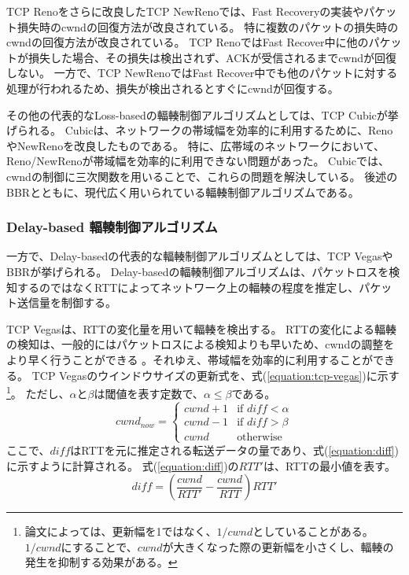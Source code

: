 \documentclass[a4paper,11pt]{jreport}
\newcommand{\equationref}[1]{式(\ref{#1})}
\begin{document}
TCP Renoをさらに改良したTCP NewReno\cite{floyd2004newreno,henderson2012newreno}では、Fast Recoveryの実装やパケット損失時のcwndの回復方法が改良されている。
特に複数のパケットの損失時のcwndの回復方法が改良されている。
TCP RenoではFast Recover中に他のパケットが損失した場合、その損失は検出されず、ACKが受信されるまでcwndが回復しない。
一方で、TCP NewRenoではFast Recover中でも他のパケットに対する処理が行われるため、損失が検出されるとすぐにcwndが回復する。

その他の代表的なLoss-basedの輻輳制御アルゴリズムとしては、TCP Cubic\cite{cubic}が挙げられる。
Cubicは、ネットワークの帯域幅を効率的に利用するために、RenoやNewRenoを改良したものである。
特に、広帯域のネットワークにおいて、Reno/NewRenoが帯域幅を効率的に利用できない問題があった。
Cubicでは、cwndの制御に三次関数を用いることで、これらの問題を解決している。
後述のBBR\cite{bbr}とともに、現代広く用いられている輻輳制御アルゴリズムである。

\subsubsection*{Delay-based 輻輳制御アルゴリズム}

一方で、Delay-basedの代表的な輻輳制御アルゴリズムとしては、TCP Vegas\cite{tcp-vegas}やBBR\cite{bbr}が挙げられる。
Delay-basedの輻輳制御アルゴリズムは、パケットロスを検知するのではなくRTTによってネットワーク上の輻輳の程度を推定し、パケット送信量を制御する。

TCP Vegasは、RTTの変化量を用いて輻輳を検出する。
RTTの変化による輻輳の検知は、一般的にはパケットロスによる検知よりも早いため、cwndの調整をより早く行うことができる
。それゆえ、帯域幅を効率的に利用することができる。
TCP Vegasのウインドウサイズの更新式を、\equationref{equation:tcp-vegas}に示す
\footnote{論文によっては、更新幅を1ではなく、$1/cwnd$としていることがある。
$1/cwnd$にすることで、$cwnd$が大きくなった際の更新幅を小さくし、輻輳の発生を抑制する効果がある。}。
ただし、$\alpha$と$\beta$は閾値を表す定数で、$\alpha \leq \beta$である。
\begin{equation}
  \label{equation:tcp-vegas}
  cwnd_{now} =
  \begin{cases}
    cwnd + 1 & \text{if } diff < \alpha \\
    cwnd - 1 & \text{if } diff > \beta \\
    cwnd & \text{otherwise}
  \end{cases}
\end{equation}
ここで、$diff$はRTTを元に推定される転送データの量であり、\equationref{equation:diff}に示すように計算される。
\equationref{equation:diff}の$RTT'$は、RTTの最小値を表す。
\begin{equation}
  \label{equation:diff}
  diff = \left( \frac{cwnd}{RTT'} - \frac{cwnd}{RTT}\right) RTT'
\end{equation}
\end{document}
